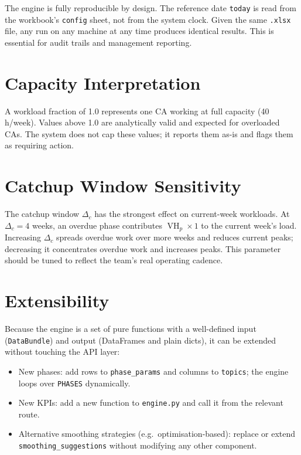 \documentclass[12pt,a4paper]{report}
\DeclareMathOperator{\vh}{VH}
\begin{document}
The engine is fully reproducible by design. The reference date
\texttt{today} is read from the workbook's \texttt{config} sheet,
not from the system clock. Given the same \texttt{.xlsx} file,
any run on any machine at any time produces identical results.
This is essential for audit trails and management reporting.

\section{Capacity Interpretation}

A workload fraction of 1.0 represents one CA working at full capacity
(40 h/week). Values above 1.0 are analytically valid and expected for
overloaded CAs. The system does not cap these values; it reports them
as-is and flags them as requiring action.

\section{Catchup Window Sensitivity}

The catchup window $\Delta_c$ has the strongest effect on current-week
workloads. At $\Delta_c = 4$ weeks, an overdue phase contributes
$\vh_p \times 1$ to the current week's load. Increasing $\Delta_c$
spreads overdue work over more weeks and reduces current peaks;
decreasing it concentrates overdue work and increases peaks. This
parameter should be tuned to reflect the team's real operating cadence.

\section{Extensibility}

Because the engine is a set of pure functions with a well-defined input
(\texttt{DataBundle}) and output (DataFrames and plain dicts), it can
be extended without touching the API layer:

\begin{itemize}
  \item New phases: add rows to \texttt{phase\_params} and columns to
        \texttt{topics}; the engine loops over \texttt{PHASES} dynamically.
  \item New KPIs: add a new function to \texttt{engine.py} and call it
        from the relevant route.
  \item Alternative smoothing strategies (e.g.\ optimisation-based):
        replace or extend \texttt{smoothing\_suggestions} without
        modifying any other component.
\end{itemize}
\end{document}
